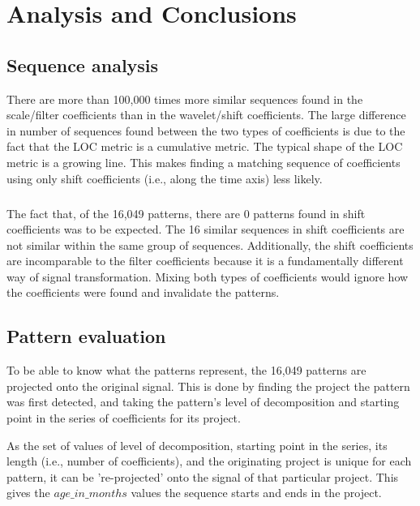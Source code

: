 \chapter{Analysis and Conclusions}
\label{analysis}

\section{Sequence analysis}
There are more than 100,000 times more similar sequences found in the
scale/filter coefficients than in the wavelet/shift coefficients. The large
difference in number of sequences found between the two types of coefficients
is due to the fact that the LOC metric is a cumulative metric. The typical shape
of the LOC metric is a growing line. This makes finding a matching sequence of
coefficients using only shift coefficients (i.e., along the time axis) less
likely.

\paragraph{}
The fact that, of the 16,049 patterns, there are 0 patterns found in shift
coefficients was to be expected. The 16 similar sequences in shift coefficients
are not similar within the same group of sequences. Additionally, the shift
coefficients are incomparable to the filter coefficients because it is a
fundamentally different way of signal transformation. Mixing both types of
coefficients would ignore how the coefficients were found and invalidate the
patterns.

\section{Pattern evaluation}
\label{section:pattern_evaluation}
To be able to know what the patterns represent, the 16,049 patterns are
projected onto the original signal. This is done by finding the project the
pattern was first detected, and taking the pattern's level of decomposition and
starting point in the series of coefficients for its project.

As the set of values of level of decomposition, starting point in the series,
its length (i.e., number of coefficients), and the originating project is
unique for each pattern, it can be 're-projected' onto the signal of that
particular project. This gives the $age\_in\_months$ values the sequence starts
and ends in the project.

